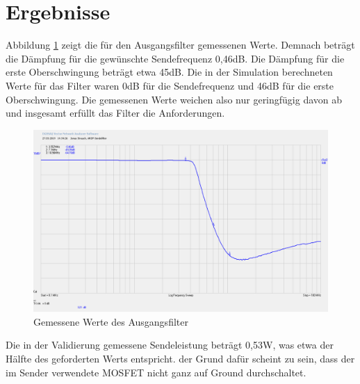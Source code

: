 \section{Ergebnisse}
Abbildung \ref{filter} zeigt die für den Ausgangsfilter gemessenen Werte. Demnach beträgt die Dämpfung für die gewünschte Sendefrequenz 0,46dB. Die Dämpfung für die erste Oberschwingung beträgt etwa 45dB. Die in der Simulation berechneten Werte für das Filter waren 0dB für die Sendefrequenz und 46dB für die erste Oberschwingung. Die gemessenen Werte weichen also nur geringfügig davon ab und insgesamt erfüllt das Filter die Anforderungen.\\
\begin{figure}[H]\centering
	\includegraphics[width=16cm]{res/Filterwerte.png}
	\caption{Gemessene Werte des Ausgangsfilter}
	\label{filter}
\end{figure}

Die in der Validierung gemessene Sendeleistung beträgt 0,53W, was etwa der Hälfte des geforderten Werts entspricht. der Grund dafür scheint zu sein, dass der im Sender verwendete MOSFET nicht ganz auf Ground durchschaltet.